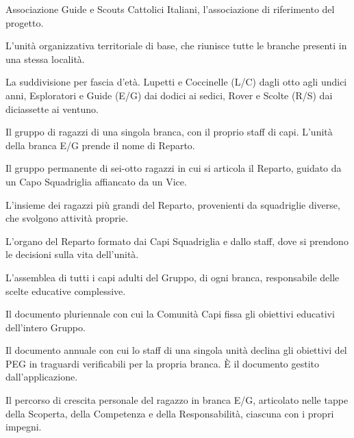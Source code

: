 \documentclass[11pt]{article}
\numberwithin{figure}{section}
\begin{document}
\begin{description}\setlength{\itemsep}{0.4em}

\item[AGESCI] Associazione Guide e Scouts Cattolici Italiani, l'associazione
di riferimento del progetto.

\item[Gruppo] L'unità organizzativa territoriale di base, che riunisce tutte
le branche presenti in una stessa località.

\item[Branca] La suddivisione per fascia d'età. Lupetti e Coccinelle (L/C)
dagli otto agli undici anni, Esploratori e Guide (E/G) dai dodici ai sedici,
Rover e Scolte (R/S) dai diciassette ai ventuno.

\item[Unità] Il gruppo di ragazzi di una singola branca, con il proprio staff
di capi. L'unità della branca E/G prende il nome di Reparto.

\item[Squadriglia] Il gruppo permanente di sei-otto ragazzi in cui si articola
il Reparto, guidato da un Capo Squadriglia affiancato da un Vice.

\item[Alta Squadriglia] L'insieme dei ragazzi più grandi del Reparto,
provenienti da squadriglie diverse, che svolgono attività proprie.

\item[Consiglio Capi] L'organo del Reparto formato dai Capi Squadriglia e
dallo staff, dove si prendono le decisioni sulla vita dell'unità.

\item[Comunità Capi (Co.Ca.)] L'assemblea di tutti i capi adulti del Gruppo,
di ogni branca, responsabile delle scelte educative complessive.

\item[Progetto Educativo di Gruppo (PEG)] Il documento pluriennale con cui la
Comunità Capi fissa gli obiettivi educativi dell'intero Gruppo.

\item[Programma d'Unità] Il documento annuale con cui lo staff di una singola
unità declina gli obiettivi del PEG in traguardi verificabili per la propria
branca. È il documento gestito dall'applicazione.

\item[Sentiero] Il percorso di crescita personale del ragazzo in branca E/G,
articolato nelle tappe della Scoperta, della Competenza e della
Responsabilità, ciascuna con i propri impegni.


\end{description}
\end{document}
